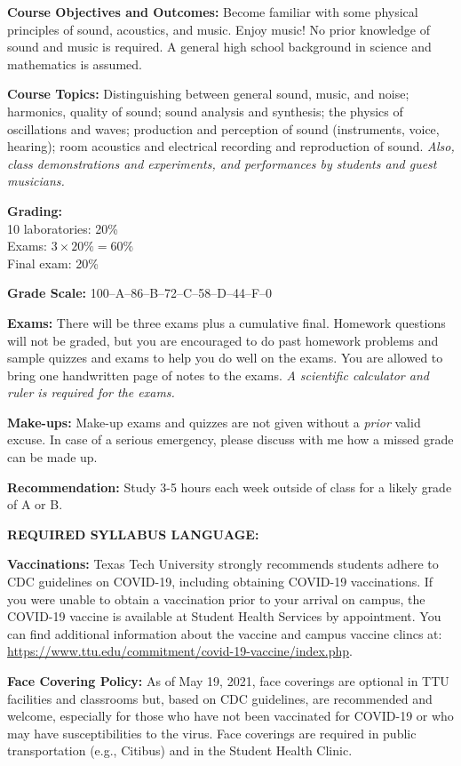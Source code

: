 \documentclass[11pt]{NSF}
\begin{document}
{\bf Course Objectives and Outcomes:}
Become familiar with some physical principles of sound, acoustics, and music. 
Enjoy music!
No prior knowledge of sound and music is required. 
A general high school background in science and mathematics is assumed.

{\bf Course Topics:} 
Distinguishing between general sound, music, and noise;
harmonics, quality of sound; sound analysis and synthesis;
the physics of oscillations and waves;
production and perception of sound (instruments, voice, hearing);
room acoustics and electrical recording and reproduction of sound.
{\em Also, class demonstrations and experiments, and performances by 
students and guest musicians.}

\newpage
{\bf Grading:}\\
10 laboratories: 20\%\\
Exams: $3\times 20\% = 60\%$\\
Final exam: 20\%

{\bf Grade Scale:} 100--A--86--B--72--C--58--D--44--F--0
 
{\bf Exams:}
There will be three exams plus a cumulative final.
Homework questions will not be graded, but you are encouraged
to do past homework problems and sample quizzes and exams
to help you do well on the exams.
You are allowed to bring one handwritten page of notes to the exams.
{\em A scientific calculator and ruler is required for the exams.}

{\bf Make-ups:}
Make-up exams and quizzes are not given without a {\em prior} valid excuse.
In case of a serious emergency, please discuss with me how a missed
grade can be made up.

{\bf Recommendation:} 
Study 3-5 hours each week outside of class for a likely grade of A or B.

{\bf REQUIRED SYLLABUS LANGUAGE:}

{\bf Vaccinations:} 
Texas Tech University strongly recommends students adhere to CDC guidelines on
COVID-19, including obtaining COVID-19 vaccinations. If you were unable to
obtain a vaccination prior to your arrival on campus, the COVID-19 vaccine is
available at Student Health Services by appointment. You can find additional
information about the vaccine and campus vaccine clincs at:
\url{https://www.ttu.edu/commitment/covid-19-vaccine/index.php}.

{\bf Face Covering Policy:} 
As of May 19, 2021, face coverings are optional in TTU facilities and
classrooms but, based on CDC guidelines, are recommended and welcome,
especially for those who have not been vaccinated for COVID-19 or who may have
susceptibilities to the virus. Face coverings are required in public
transportation (e.g., Citibus) and in the Student Health Clinic. 
\end{document}
